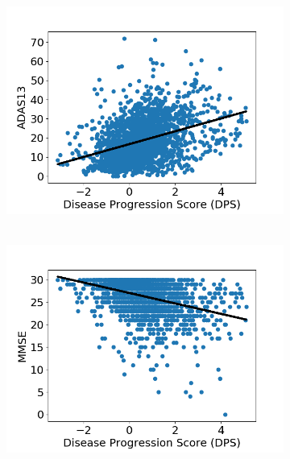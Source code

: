 \begin{frame}
\begin{figure}[h]
  \begin{subfigure}{0.22\textwidth}
    \centering
    \\ 
    \includegraphics[width=1.1\textwidth]{../overview/figures/stagingCogTestsScatterPlot_adniThFWHM0Initk-meansCl3Pr0Ra1Mrf5_VWDPMMean_ADAS13.png}
  \end{subfigure}
  \begin{subfigure}{0.22\textwidth}
    \centering
    \\ 
    \includegraphics[width=1.1\textwidth]{../overview/figures/stagingCogTestsScatterPlot_adniThFWHM0Initk-meansCl3Pr0Ra1Mrf5_VWDPMMean_MMSE.png}

\end{subfigure}
\end{figure}
\end{frame}
